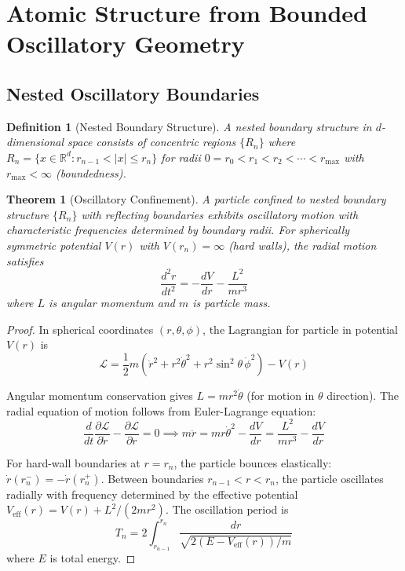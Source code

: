 \documentclass[twocolumn,10pt]{article}
\newtheorem{theorem}{Theorem}[section]
\newtheorem{definition}{Definition}[section]
\begin{document}
\section{Atomic Structure from Bounded Oscillatory Geometry}

\subsection{Nested Oscillatory Boundaries}

\begin{definition}[Nested Boundary Structure]
A nested boundary structure in $d$-dimensional space consists of concentric regions $\{R_n\}$ where $R_n = \{x \in \mathbb{R}^d : r_{n-1} < |x| \leq r_n\}$ for radii $0 = r_0 < r_1 < r_2 < \cdots < r_{\max}$ with $r_{\max} < \infty$ (boundedness).
\end{definition}

\begin{theorem}[Oscillatory Confinement]
\label{thm:oscillatory_confinement}
A particle confined to nested boundary structure $\{R_n\}$ with reflecting boundaries exhibits oscillatory motion with characteristic frequencies determined by boundary radii. For spherically symmetric potential $V(r)$ with $V(r_n) = \infty$ (hard walls), the radial motion satisfies
\begin{equation}
\frac{d^2r}{dt^2} = -\frac{dV}{dr} - \frac{L^2}{mr^3}
\end{equation}
where $L$ is angular momentum and $m$ is particle mass.
\end{theorem}

\begin{proof}
In spherical coordinates $(r, \theta, \phi)$, the Lagrangian for particle in potential $V(r)$ is
\begin{equation}
\mathcal{L} = \frac{1}{2}m\left(\dot{r}^2 + r^2\dot{\theta}^2 + r^2\sin^2\theta \, \dot{\phi}^2\right) - V(r)
\end{equation}

Angular momentum conservation gives $L = mr^2\dot{\theta}$ (for motion in $\theta$ direction). The radial equation of motion follows from Euler-Lagrange equation:
\begin{equation}
\frac{d}{dt}\frac{\partial \mathcal{L}}{\partial \dot{r}} - \frac{\partial \mathcal{L}}{\partial r} = 0 \implies m\ddot{r} = mr\dot{\theta}^2 - \frac{dV}{dr} = \frac{L^2}{mr^3} - \frac{dV}{dr}
\end{equation}

For hard-wall boundaries at $r = r_n$, the particle bounces elastically: $\dot{r}(r_n^-) = -\dot{r}(r_n^+)$. Between boundaries $r_{n-1} < r < r_n$, the particle oscillates radially with frequency determined by the effective potential $V_{\text{eff}}(r) = V(r) + L^2/(2mr^2)$. The oscillation period is
\begin{equation}
T_n = 2\int_{r_{n-1}}^{r_n} \frac{dr}{\sqrt{2(E - V_{\text{eff}}(r))/m}}
\end{equation}
where $E$ is total energy.
\end{proof}
\end{document}
